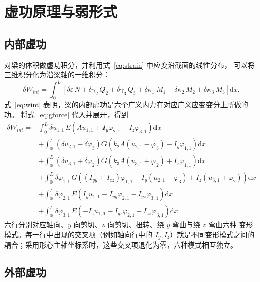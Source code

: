 \documentclass[UTF8,a4paper,11pt]{ctexart}
\newcommand{\ud}{\mathrm{d}}
\begin{document}
\section{虚功原理与弱形式}

\subsection{内部虚功}

对梁的体积做虚功积分，并利用式~\eqref{eq:strain} 中应变沿截面的线性分布，
可以将三维积分化为沿梁轴的一维积分：
\begin{equation}\label{eq:wint}
\boxed{
\delta W_{int}
=\int_0^L\left[
\delta\varepsilon\,N+\delta\gamma_2\,Q_2+\delta\gamma_3\,Q_3
+\delta\kappa_1\,M_1+\delta\kappa_2\,M_2+\delta\kappa_3\,M_3
\right]\ud x.}
\end{equation}
式~\eqref{eq:wint} 表明，梁的内部虚功是六个广义内力在对应广义应变变分上所做的功。
将式~\eqref{eq:gforce} 代入并展开，得到
\begin{equation}\label{eq:wint-expand}
\begin{aligned}
\delta W_{int}
={}&\int_0^L \delta u_{1,1}\,E\left(Au_{1,1}+I_y\varphi_{2,1}-I_z\varphi_{3,1}\right)\ud x\\
&+\int_0^L\left(\delta u_{2,1}-\delta\varphi_3\right)
 G\left(k_2A\left(u_{2,1}-\varphi_3\right)-I_y\varphi_{1,1}\right)\ud x\\
&+\int_0^L\left(\delta u_{3,1}+\delta\varphi_2\right)
 G\left(k_3A\left(u_{3,1}+\varphi_2\right)+I_z\varphi_{1,1}\right)\ud x\\
&+\int_0^L \delta\varphi_{1,1}\,
 G\left(\left(I_{yy}+I_{zz}\right)\varphi_{1,1}
 -I_y\left(u_{2,1}-\varphi_3\right)
 +I_z\left(u_{3,1}+\varphi_2\right)\right)\ud x\\
&+\int_0^L \delta\varphi_{2,1}\,
 E\left(I_yu_{1,1}+I_{yy}\varphi_{2,1}-I_{yz}\varphi_{3,1}\right)\ud x\\
&+\int_0^L \delta\varphi_{3,1}\,
 E\left(-I_zu_{1,1}-I_{yz}\varphi_{2,1}+I_{zz}\varphi_{3,1}\right)\ud x.
\end{aligned}
\end{equation}
六行分别对应轴向、$y$ 向剪切、$z$ 向剪切、扭转、绕 $y$ 弯曲与绕 $z$ 弯曲六种
变形模式。每一行中出现的交叉项（例如轴向行中的 $I_y,I_z$）就是不同变形模式之间的
耦合；采用形心主轴坐标系时，这些交叉项退化为零，六种模式相互独立。

\subsection{外部虚功}
\end{document}
